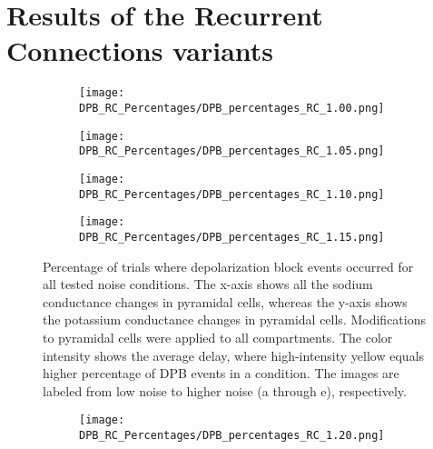 \section{Results of the Recurrent Connections variants}
\begin{figure}[H]
    \centering
    \begin{subfigure}{0.48\textwidth}
        \texttt{[image: DPB\_RC\_Percentages/DPB\_percentages\_RC\_1.00.png]}
        \caption{} %
    \end{subfigure}\hfill
    \begin{subfigure}{0.48\textwidth}
        \texttt{[image: DPB\_RC\_Percentages/DPB\_percentages\_RC\_1.05.png]}
        \caption{} %
    \end{subfigure}

    \bigskip %

    \begin{subfigure}{0.48\textwidth}
        \texttt{[image: DPB\_RC\_Percentages/DPB\_percentages\_RC\_1.10.png]}
        \caption{} %
    \end{subfigure}\hfill
    \begin{subfigure}{0.48\textwidth}
        \texttt{[image: DPB\_RC\_Percentages/DPB\_percentages\_RC\_1.15.png]}
        \caption{} %
    \end{subfigure}

    \caption[RC DPB percentage matrices (all)]{Percentage of trials where depolarization block events occurred for all tested noise conditions.
        The x-axis shows all the sodium conductance changes in pyramidal cells, whereas the y-axis shows the potassium conductance changes in pyramidal cells.
        Modifications to pyramidal cells were applied to all compartments.
        The color intensity shows the average delay, where high-intensity yellow equals higher percentage of DPB events in a condition.
        The images are labeled from low noise to higher noise (a through e), respectively.}\label{fig:rc_dpb_percentage_matrices}
\end{figure}

\begin{figure}[H] \ContinuedFloat%
    \centering
    \begin{subfigure}{0.48\textwidth}
        \texttt{[image: DPB\_RC\_Percentages/DPB\_percentages\_RC\_1.20.png]}
        \caption{} %
    \end{subfigure}\hfill
\end{figure}